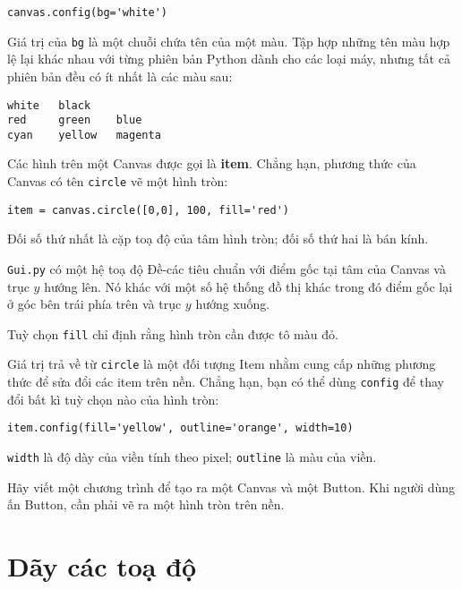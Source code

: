 \documentclass[11pt]{book}
\begin{document}
\beforeverb
\begin{verbatim}
canvas.config(bg='white')
\end{verbatim}
\afterverb
%
Giá trị của {\tt bg} là một chuỗi chứa tên của một màu.
Tập hợp những tên màu hợp lệ lại khác nhau với từng phiên bản
Python dành cho các loại máy, nhưng tất cả phiên bản đều có
ít nhất là các màu sau:

\beforeverb
\begin{verbatim}
white   black
red     green    blue   
cyan    yellow   magenta
\end{verbatim}
\afterverb
%
Các hình trên một Canvas được gọi là {\bf item}.  Chẳng hạn,
phương thức của Canvas có tên {\tt circle} vẽ một hình tròn:


\beforeverb
\begin{verbatim}
item = canvas.circle([0,0], 100, fill='red')
\end{verbatim}
\afterverb
%
Đối số thứ nhất là cặp toạ độ của tâm hình tròn; đối số thứ hai
là bán kính.


{\tt Gui.py} có một hệ toạ độ Đề-các tiêu chuẩn với
điểm gốc tại tâm của Canvas và trục $y$ 
hướng lên. Nó khác với một số hệ thống đồ thị khác trong đó
điểm gốc lại ở góc bên trái phía trên và trục $y$ hướng xuống.

Tuỳ chọn {\tt fill} chỉ định rằng hình tròn cần được tô màu đỏ.

Giá trị trả về từ {\tt circle} là một đối tượng Item nhằm cung cấp
những phương thức để sửa đổi các item trên nền.  Chẳng hạn,
bạn có thể dùng {\tt config} để thay đổi bất kì tuỳ chọn nào
của hình tròn:

\beforeverb
\begin{verbatim}
item.config(fill='yellow', outline='orange', width=10)
\end{verbatim}
\afterverb
%
{\tt width} là độ dày của viền tính theo pixel;
{\tt outline} là màu của viền.

\begin{ex}
\label{circle}
Hãy viết một chương trình để tạo ra một Canvas và một Button.  
Khi người dùng ấn Button, cần phải vẽ ra một hình tròn trên nền.
\end{ex}


\section{Dãy các toạ độ}
\end{document}
